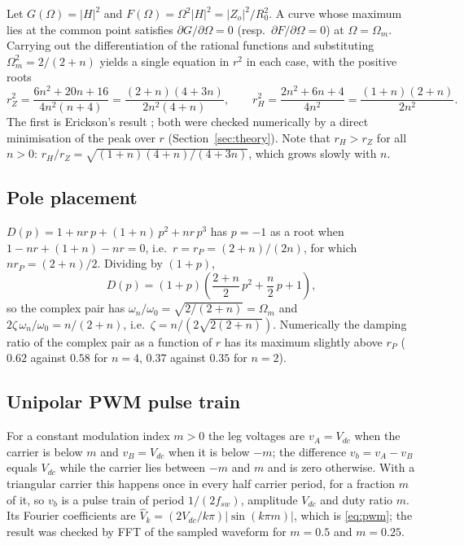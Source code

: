 \documentclass[11pt,a4paper]{article}
\begin{document}
Let $G(\Omega) = |H|^2$ and $F(\Omega) = \Omega^2 |H|^2 = |Z_o|^2/R_0^2$. A curve whose
maximum lies at the common point satisfies $\partial G/\partial\Omega = 0$ (resp.\
$\partial F/\partial\Omega = 0$) at $\Omega = \Omega_m$. Carrying out the differentiation
of the rational functions and substituting $\Omega_m^2 = 2/(2+n)$ yields a single
equation in $r^2$ in each case, with the positive roots
\begin{equation}
r_Z^2 = \frac{6n^2 + 20n + 16}{4n^2(n+4)} = \frac{(2+n)(4+3n)}{2n^2(4+n)}, \qquad
r_H^2 = \frac{2n^2 + 6n + 4}{4n^2} = \frac{(1+n)(2+n)}{2n^2}.
\end{equation}
The first is Erickson's result \cite{Erickson1999}; both were checked numerically by a
direct minimisation of the peak over $r$ (Section~\ref{sec:theory}). Note that $r_H > r_Z$
for all $n > 0$: $r_H/r_Z = \sqrt{(1+n)(4+n)/(4+3n)}$, which grows slowly with $n$.

\subsection{Pole placement}

$D(p) = 1 + nr\,p + (1+n)\,p^2 + nr\,p^3$ has $p = -1$ as a root when
$1 - nr + (1+n) - nr = 0$, i.e.\ $r = r_P = (2+n)/(2n)$, for which $nr_P = (2+n)/2$.
Dividing by $(1+p)$,
\begin{equation}
D(p) = (1+p)\left(\frac{2+n}{2}\,p^2 + \frac{n}{2}\,p + 1\right),
\end{equation}
so the complex pair has $\omega_n/\omega_0 = \sqrt{2/(2+n)} = \Omega_m$ and
$2\zeta\,\omega_n/\omega_0 = n/(2+n)$, i.e.\ $\zeta = n/(2\sqrt{2(2+n)})$. Numerically
the damping ratio of the complex pair as a function of $r$ has its maximum slightly above
$r_P$ ($0.62$ against $0.58$ for $n = 4$, $0.37$ against $0.35$ for $n = 2$).

\subsection{Unipolar PWM pulse train}

For a constant modulation index $m > 0$ the leg voltages are $v_A = V_{dc}$ when the
carrier is below $m$ and $v_B = V_{dc}$ when it is below $-m$; the difference
$v_b = v_A - v_B$ equals $V_{dc}$ while the carrier lies between $-m$ and $m$ and is zero
otherwise. With a triangular carrier this happens once in every half carrier period, for
a fraction $m$ of it, so $v_b$ is a pulse train of period $1/(2f_{sw})$, amplitude
$V_{dc}$ and duty ratio $m$. Its Fourier coefficients are
$\hat V_k = (2V_{dc}/k\pi)|\sin(k\pi m)|$, which is \eqref{eq:pwm}; the result was checked
by FFT of the sampled waveform for $m = 0.5$ and $m = 0.25$.
\end{document}
